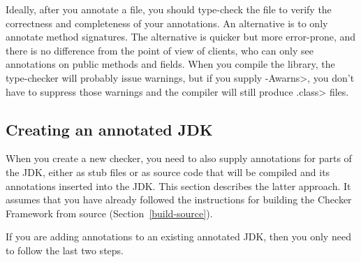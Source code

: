 Ideally, after you annotate a file, you should type-check the file to verify
the correctness and completeness of your annotations.  An alternative is to
only annotate method signatures.  The alternative is quicker but more
error-prone, and there is no difference from the point of view of clients,
who can only see annotations on public methods and fields.  When you
compile the library, the type-checker will probably issue warnings, but if
you supply \<-Awarns>, you don't have to suppress those warnings and the
compiler will still produce \<.class> files.


\subsection{Creating an annotated JDK\label{annotating-jdk}}

When you create a new checker, you need to also supply annotations for
parts of the JDK, either as stub files or as source code that will be
compiled and its annotations inserted into the JDK\@.  This
section describes the latter approach.
It assumes that you have already followed the instructions for building the
Checker Framework from source (Section~\ref{build-source}).

If you are adding annotations to an existing annotated JDK, then you only
need to follow the last two steps.

